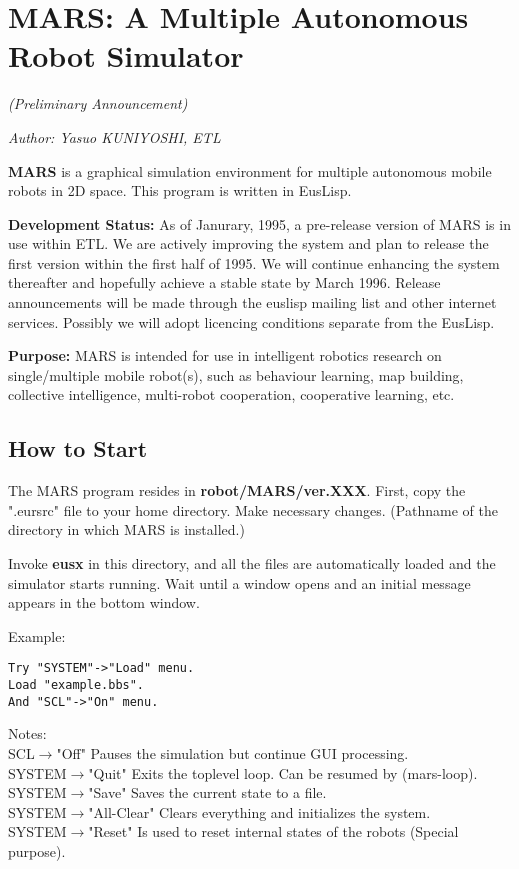 \newpage

\section{\label{MARS} MARS: A Multiple Autonomous Robot Simulator}
\hfill {\Large \em (Preliminary Announcement)}

\hfill {\em Author: Yasuo KUNIYOSHI, ETL}

{\bf MARS} is a graphical simulation environment for multiple autonomous
mobile robots in 2D space.  This program is written in EusLisp.

{\bf Development Status:} As of Janurary, 1995, a pre-release version
of MARS is in use within ETL. We are actively improving the system and
plan to release the first version within the first half of 1995. We
will continue enhancing the system thereafter and hopefully achieve a
stable state by March 1996. Release announcements will be made through
the euslisp mailing list and other internet services.
Possibly we will adopt licencing conditions separate from the EusLisp.

{\bf Purpose:}
MARS is intended for use in intelligent robotics research on
single/multiple mobile robot(s), such as behaviour learning, map
building, collective intelligence, multi-robot cooperation,
cooperative learning, etc.


\subsection{How to Start} The MARS program resides in {\bf
robot/MARS/ver.XXX}. First, copy the ".eursrc" file to your home
directory. Make necessary changes. (Pathname of the directory in which
MARS is installed.)

Invoke {\bf eusx} in this directory,  and all the files are
automatically loaded and the simulator starts running.
Wait until a window opens and an initial message appears in the bottom window.

Example:
\begin{verbatim}
Try "SYSTEM"->"Load" menu.
Load "example.bbs".
And "SCL"->"On" menu.
\end{verbatim}

Notes:\\
SCL$\rightarrow$"Off" Pauses the simulation but continue GUI processing.\\
SYSTEM$\rightarrow$"Quit" Exits the toplevel loop. Can be resumed by (mars-loop).\\
SYSTEM$\rightarrow$"Save" Saves the current state to a file.\\
SYSTEM$\rightarrow$"All-Clear" Clears everything and initializes the system.\\
SYSTEM$\rightarrow$"Reset" Is used to reset internal states of the robots
(Special purpose).\\

